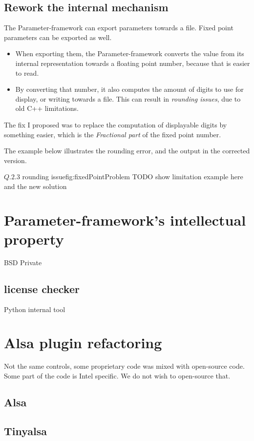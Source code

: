\subsection{Rework the internal mechanism}
The Parameter-framework can export parameters towards a file. Fixed
point parameters can be exported as well.
\begin{itemize}
    \item When exporting them, the Parameter-framework converts the value from
        its internal representation towards a floating point number, because that is
        easier to read.
    \item By converting that number, it also computes the amount of digits
        to use for display, or writing towards a file. This can result in
        \emph{rounding issues}, due to old C++ limitations.
\end{itemize}
The fix I proposed was to replace the computation of displayable digits by something
easier, which is the \emph{Fractional part} of the fixed point number.

The example below illustrates the rounding error, and the output in the corrected version.
\begin{figureGraphics}{$Q.2.3$ rounding issue}{fig:fixedPointProblem}
    TODO show limitation example here and the new solution\\
\end{figureGraphics}


\section{Parameter-framework's intellectual property}
BSD
Private
\subsection{license checker}
Python internal tool

\section{Alsa plugin refactoring}
Not the same controls, some proprietary code was mixed with open-source code.
Some part of the code is Intel specific. We do not wish to open-source that.

\subsection{Alsa}
\subsection{Tinyalsa}
